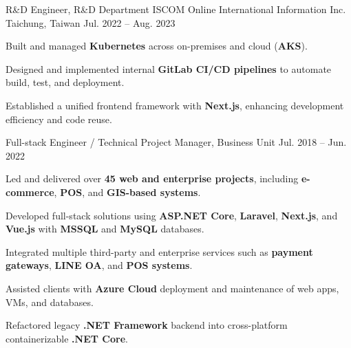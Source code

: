 

\begin{cventries}

  \cventry
    {R\&D Engineer, R\&D Department} %
    {ISCOM Online International Information Inc.} %
    {Taichung, Taiwan} %
    {Jul. 2022 -- Aug. 2023} %
    {
      \begin{cvitems}
        \item {Built and managed \textbf{Kubernetes} across on-premises and cloud (\textbf{AKS}).}
        \item {Designed and implemented internal \textbf{GitLab CI/CD pipelines} to automate build, test, and deployment.}
        \item {Established a unified frontend framework with \textbf{Next.js}, enhancing development efficiency and code reuse.}
      \end{cvitems}
    }

  \cventry
    {Full-stack Engineer / Technical Project Manager, Business Unit} %
    {} %
    {} %
    {Jul. 2018 -- Jun. 2022} %
    {
      \begin{cvitems}
        \item {Led and delivered over \textbf{45 web and enterprise projects}, including \textbf{e-commerce}, \textbf{POS}, and \textbf{GIS-based systems}.}
        \item {Developed full-stack solutions using \textbf{ASP.NET Core}, \textbf{Laravel}, \textbf{Next.js}, and \textbf{Vue.js} with \textbf{MSSQL} and \textbf{MySQL} databases.}
        \item {Integrated multiple third-party and enterprise services such as \textbf{payment gateways}, \textbf{LINE OA}, and \textbf{POS systems}.}
        \item {Assisted clients with \textbf{Azure Cloud} deployment and maintenance of web apps, VMs, and databases.}
        \item {Refactored legacy \textbf{.NET Framework} backend into cross-platform containerizable \textbf{.NET Core}.}
      \end{cvitems}
    }


\end{cventries}
